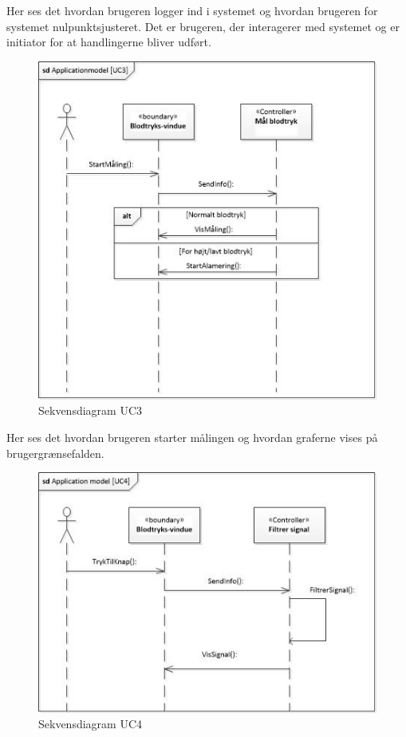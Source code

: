 Her ses det hvordan brugeren logger ind i systemet og hvordan brugeren for systemet nulpunktsjusteret. Det er brugeren, der interagerer med systemet og er initiator for at handlingerne bliver udført. 

\begin{figure}[H]
	\includegraphics[width=1\textwidth]{Figurer/ISE/sdAppModelUC3}
	\caption{Sekvensdiagram UC3}
	\label{sd UC3}
\end{figure}

Her ses det hvordan brugeren starter målingen og hvordan graferne vises på brugergrænsefalden.

\begin{figure}[H]
	\includegraphics[width=1\textwidth]{Figurer/ISE/sdAppModelUC4}
	\caption{Sekvensdiagram UC4}
	\label{sd UC4}
\end{figure}

